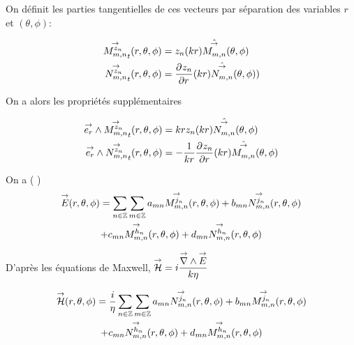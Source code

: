 

        On définit les parties tangentielles de ces vecteurs par séparation des variables \(r\) et \((\theta,\phi)\):
     
        \begin{align}
          \Mmn[z_n]_t(\rtp) &= z_n(kr)\hat{\Mmn}(\tp)
          \\
          \Nmn[z_n]_t(\rtp) &= \ddr{r}{z_n}(kr)\hat{\Nmn}(\tp))
        \end{align}

        On a alors les propriétés supplémentaires

        \begin{align}
          \vect{e_r} \pvect \Mmn[z_n]_t(\rtp) &= krz_n(kr)\hat{\Nmn}(\tp)
          \\
          \vect{e_r} \pvect \Nmn[z_n]_t(\rtp) &= -\frac{1}{kr}\ddr{r}{z_n}(kr)\hat{\Mmn}(\tp)
        \end{align}


        On a ( \cite{cheng_spectral_1993})
        \begin{multline}
            \vE(\rtp) = \sum_{n\in\ZZ}\sum_{m\in\ZZ} a_{mn} \Mmn[j_n](\rtp) + b_{mn} \Nmn[j_n](\rtp)
            \\
            + c_{mn} \Mmn[h_n](\rtp) + d_{mn} \Nmn[h_n](\rtp)
        \end{multline}

        D'après les équations de Maxwell, \(\vH = i\frac{\vrot \vE}{k\eta}\)

        \begin{multline}
            \vH(\rtp) = \frac{i}{\eta}\sum_{n\in\ZZ}\sum_{m\in\ZZ} a_{mn} \Nmn[j_n](\rtp) + b_{mn} \Mmn[j_n](\rtp)
            \\
            + c_{mn} \Nmn[h_n](\rtp) + d_{mn} \Mmn[h_n](\rtp)
        \end{multline}

